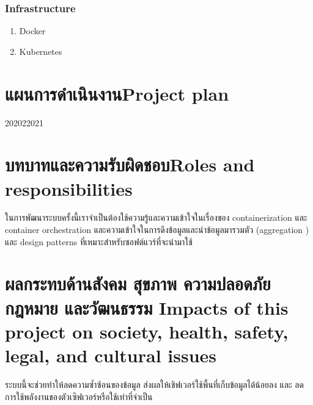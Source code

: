 \subsubsection{Infrastructure}
\begin{enumerate}
    \item Docker \cite {docker}
    \item Kubernetes \cite {kubernetes}
\end{enumerate}

\section{\ifcpe แผนการดำเนินงาน\else Project plan\fi}
\begin{plan}{6}{2020}{2}{2021}
\end{plan}

\section{\ifcpe บทบาทและความรับผิดชอบ\else Roles and responsibilities\fi}
ในการพัฒนาระบบครั้งนี้เราจำเป็นต้องใช้ความรู้และความเข้าใจในเรื่องของ containerization \cite{containerization} และ container orchestration \cite{orchestration} และความเข้าใจในการดึงข้อมูลและนำข้อมูลมารวมตัว (aggregation \cite{aggregation}) และ design patterns ที่เหมาะสำหรับซอฟต์แวร์ที่จะนำมาใช้

\section{\ifcpe%
ผลกระทบด้านสังคม สุขภาพ ความปลอดภัย กฎหมาย และวัฒนธรรม
\else%
Impacts of this project on society, health, safety, legal, and cultural issues
\fi}

ระบบนี้จะช่วยทำให้ลดความซ้ำซ้อนของข้อมูล ส่งผลให้เชิฟเวอร์ใช้พื้นที่เก็บข้อมูลได้น้อยลง และ ลดการใช้พลังงานของตัวเซิฟเวอร์หรือใช้เท่าที่จำเป็น